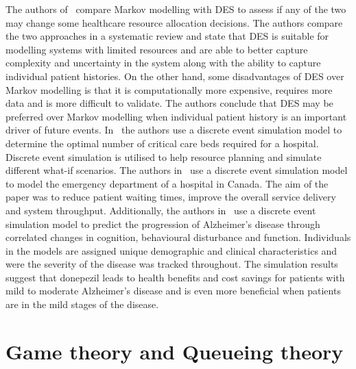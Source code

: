 The authors of~\cite{Standfield2014165} compare Markov modelling with
DES to assess if any of the two may change some healthcare resource allocation
decisions.
The authors compare the two approaches in a systematic review and state that
DES is suitable for modelling systems with limited resources and are able
to better capture complexity and uncertainty in the system along with the
ability to capture individual patient histories.
On the other hand, some disadvantages of DES over Markov modelling is that
it is computationally more expensive, requires more data and is more
difficult to validate.
The authors conclude that DES may be preferred over Markov modelling when
individual patient history is an important driver of future events.
In~\cite{williams2020discrete} the authors use a discrete event simulation
model to determine the optimal number of critical care beds required for a
hospital.
Discrete event simulation is utilised to help resource planning and simulate
different what-if scenarios.
The authors in~\cite{Duguay2007311} use a discrete event simulation model to
model the emergency department of a hospital in Canada.
The aim of the paper was to reduce patient waiting times, improve the overall
service delivery and system throughput.
Additionally, the authors in~\cite{Getsios2010411} use a discrete event
simulation model to predict the progression of Alzheimer's disease through
correlated changes in cognition, behavioural disturbance and function.
Individuals in the models are assigned unique demographic and clinical
characteristics and were the severity of the disease was tracked throughout.
The simulation results suggest that donepezil leads to health benefits and cost
savings for patients with mild to moderate Alzheimer's disease and is even
more beneficial when patients are in the mild stages of the disease.



\section{Game theory and Queueing theory}
\label{sec:lit_review_game_and_queueing_theory}

